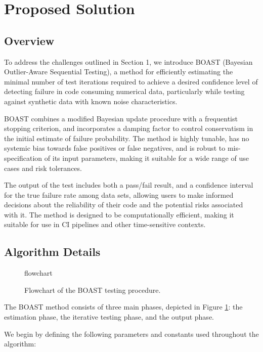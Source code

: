 \section{Proposed Solution}

\subsection{Overview}

To address the challenges outlined in Section 1, we introduce BOAST (Bayesian Outlier-Aware Sequential Testing), a method for efficiently estimating the minimal number of test iterations required to achieve a desired confidence level of detecting failure in code consuming numerical data, particularly while testing against synthetic data with known noise characteristics.

BOAST combines a modified Bayesian update procedure with a frequentist stopping criterion, and incorporates a damping factor to control conservatism in the initial estimate of failure probability. The method is highly tunable, has no systemic bias towards false positives or false negatives, and is robust to mis-specification of its input parameters, making it suitable for a wide range of use cases and risk tolerances.

The output of the test includes both a pass/fail result, and a confidence interval for the true failure rate among data sets, allowing users to make informed decisions about the reliability of their code and the potential risks associated with it. The method is designed to be computationally efficient, making it suitable for use in CI pipelines and other time-sensitive contexts.

\subsection{Algorithm Details}

\begin{figure}[ht!]
    \centering
    {flowchart}
    \caption{Flowchart of the BOAST testing procedure.}
    \label{fig:boast_flowchart}
\end{figure}

The BOAST method consists of three main phases, depicted in Figure \ref{fig:boast_flowchart}: the estimation phase, the iterative testing phase, and the output phase. 

We begin by defining the following parameters and constants used throughout the algorithm:

